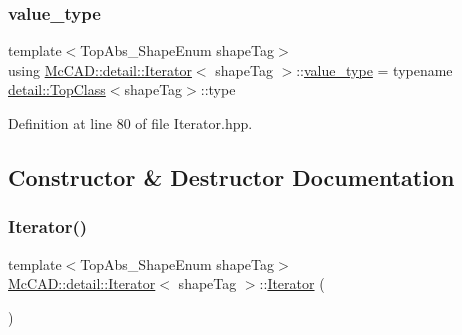 \subsubsection{\texorpdfstring{value\+\_\+type}{value\_type}}
{\footnotesize\ttfamily template$<$Top\+Abs\+\_\+\+Shape\+Enum shape\+Tag$>$ \\
using \hyperlink{classMcCAD_1_1detail_1_1Iterator}{Mc\+C\+A\+D\+::detail\+::\+Iterator}$<$ shape\+Tag $>$\+::\hyperlink{classMcCAD_1_1detail_1_1Iterator_af35396d00c2403ccfbf1b6aa51cbf40e}{value\+\_\+type} =  typename \hyperlink{structMcCAD_1_1detail_1_1TopClass}{detail\+::\+Top\+Class}$<$shape\+Tag$>$\+::type}



Definition at line 80 of file Iterator.\+hpp.



\subsection{Constructor \& Destructor Documentation}
\mbox{\label{classMcCAD_1_1detail_1_1Iterator_a7864eac2dca2a5901f7e220014eab96c}} 
\subsubsection{\texorpdfstring{Iterator()}{Iterator()}\hspace{0.1cm}{\footnotesize\ttfamily [1/2]}}
{\footnotesize\ttfamily template$<$Top\+Abs\+\_\+\+Shape\+Enum shape\+Tag$>$ \\
\hyperlink{classMcCAD_1_1detail_1_1Iterator}{Mc\+C\+A\+D\+::detail\+::\+Iterator}$<$ shape\+Tag $>$\+::\hyperlink{classMcCAD_1_1detail_1_1Iterator}{Iterator} (\begin{DoxyParamCaption}{ }\end{DoxyParamCaption})\hspace{0.3cm}{\ttfamily [default]}}

\mbox{\label{classMcCAD_1_1detail_1_1Iterator_ab1bd690b069222067c183bc010467f13}} 
